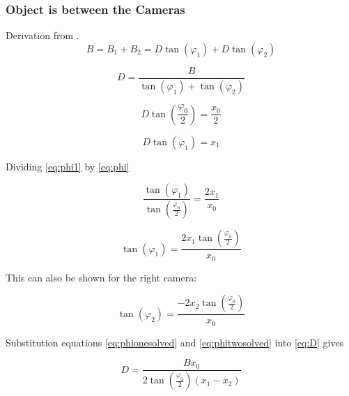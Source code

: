 \subsubsection{Object is between the Cameras}
Derivation from \cite{Mrovlje:Distance_Stereoscopic}.
\begin{equation} \label{eq:B}
B = B_{1} + B_{2} = D\tan(\varphi_{1}) + D\tan(\varphi_{2})
\end{equation}

\begin{equation} \label{eq:D}
D = \frac{B}{\tan(\varphi_{1}) + \tan(\varphi_{2})}
\end{equation}



\begin{equation} \label{eq:phi}
D\tan\left(\frac{\varphi_{0}}{2}\right) = \frac{x_{0}}{2}
\end{equation}

\begin{equation} \label{eq:phi1}
D\tan(\varphi_1) = x_1
\end{equation}

Dividing \eqref{eq:phi1} by \eqref{eq:phi}

\begin{equation} \label{eq:tanovertan}
\frac{\tan(\varphi_1)}{\tan(\frac{\varphi_0}{2})} = \frac{2x_1}{x_0}
\end{equation}

\begin{equation} \label{eq:phionesolved}
\tan(\varphi_1) = \frac{2x_1\tan(\frac{\varphi_0}{2})}{x_0}
\end{equation}

This can also be shown for the right camera:

\begin{equation} \label{eq:phitwosolved}
\tan(\varphi_2) = \frac{-2x_2\tan(\frac{\varphi_0}{2})}{x_0}
\end{equation}

Substitution equations \eqref{eq:phionesolved} and \eqref{eq:phitwosolved} into \eqref{eq:D} gives

\begin{equation} \label{eq:Distance1}
D = \frac{Bx_0}{2\tan(\frac{\varphi_0}{2})(x_1 - x_2)}
\end{equation}


